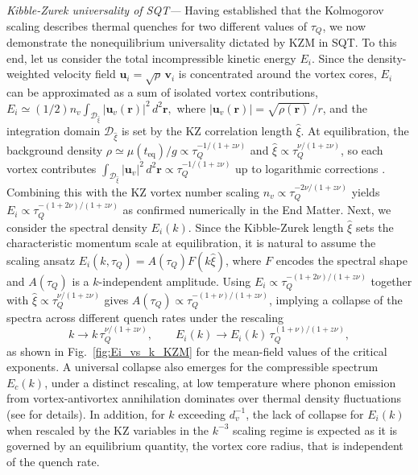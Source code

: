 \documentclass[aps,prl,twocolumn,showpacs,notitlepage,floatfix,superscriptaddress]{revtex4-1}
\begin{document}
{\it Kibble-Zurek universality of SQT---}
Having established that the Kolmogorov scaling describes thermal quenches for two different values of $\tau_Q$, we now demonstrate the nonequilibrium universality dictated by KZM in SQT.
To this end, let us consider the total incompressible kinetic energy
$E_i$.
Since the density-weighted velocity field $\boldsymbol{u}_{i}=\sqrt{\rho}\,\boldsymbol{v}_{i}$ is concentrated around the vortex cores, $E_i$ can be approximated as a sum of isolated vortex contributions,
$
E_i
\simeq
\left(
1
/ 2 \right)
n_v
\!\int_{\mathcal{D}_{\hat{\xi}}}\!
\left\vert
\boldsymbol{u}_v(\boldsymbol{r})
\right\vert^2
\,d^2\boldsymbol{r},
$
where \(
\left\vert
\boldsymbol{u}_v(\boldsymbol{r})
\right\vert
=\sqrt{\rho(\boldsymbol{r})}\,
/ r
\), and the integration domain \(\mathcal{D}_{\hat{\xi}}\) is set by the KZ correlation length \(\hat{\xi}\).
At equilibration, the background density \( \rho \simeq \mu(t_{\textrm{eq}}) / g \propto
\tau_Q^{- 1 / \left( 1 + z \nu \right)}
\) and \( \hat{\xi} \propto
\tau_Q^{\nu / \left( 1 + z \nu \right)}
\), so each vortex contributes \( \int_{\mathcal{D}_{\hat{\xi}}}
\left\vert
\boldsymbol{u}_v
\right\vert^2
\, d^2\boldsymbol{r} \propto
\tau_Q^{- 1 / \left( 1 + z \nu \right)}
\) up to logarithmic corrections \cite{SM}. Combining this with the KZ vortex number scaling \( n_v \propto
\tau_Q^{- 2 \nu / \left( 1 + z \nu \right)}
\) yields \( E_i \propto
\tau_Q^{- \left( 1 + 2 \nu \right) / \left( 1 + z \nu \right)}
\) as confirmed numerically in
the End Matter.
Next, we consider the spectral density $E_i(k)$. Since the Kibble-Zurek length $\hat{\xi}$ sets the characteristic momentum scale at equilibration, it is natural to assume the scaling ansatz $E_i(k,\tau_Q) = A(\tau_Q) F(k\hat{\xi})$, where $F$ encodes the spectral shape and $A(\tau_{Q})$ is a $k$-independent amplitude. Using $E_i \propto
\tau_Q^{- \left( 1 + 2 \nu \right) / \left( 1 + z \nu \right)}$ together with $\hat{\xi} \propto \tau_Q^{\nu / \left( 1 + z \nu \right)}$ gives $A(\tau_Q) \propto \tau_Q^{- \left( 1 + \nu \right) / \left( 1 + z \nu \right)}$, implying a collapse of the spectra across different quench rates under the rescaling
\begin{equation}
k \to k\, \tau_Q^{\nu / \left( 1 + z \nu \right)}
, \qquad
E_i(k) \to E_i(k)\, \tau_Q^{\left( 1 + \nu \right) / \left( 1 + z \nu \right)}
,
\label{Ei_scaling}
\end{equation}
as shown in Fig.~\ref{fig:Ei_vs_k_KZM} for the mean-field values of the critical exponents.
A universal collapse also emerges for the compressible spectrum $E_c(k)$, under a distinct rescaling, at low temperature where phonon emission from vortex-antivortex annihilation
\cite{Kumar2025}
dominates over thermal density fluctuations (see \cite{SM} for details).
In addition, for $k$ exceeding $d_v^{-1}$, the lack of collapse for $E_i(k)$ when rescaled by the KZ variables in the $k^{-3}$ scaling regime is expected as it is governed by an equilibrium quantity, the vortex core radius, that is independent of the quench rate.
\end{document}
